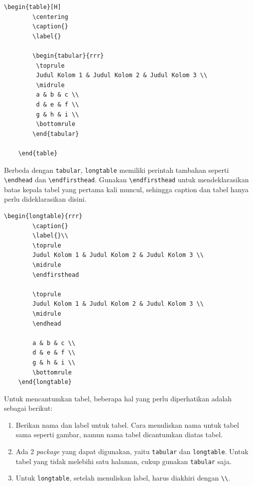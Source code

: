 \begin{lstlisting}[caption={Kode Latex untuk tabel biasa}]
    \begin{table}[H]
        \centering
        \caption{}
        \label{}
        
        \begin{tabular}{rrr}
         \toprule
         Judul Kolom 1 & Judul Kolom 2 & Judul Kolom 3 \\
         \midrule
         a & b & c \\
         d & e & f \\
         g & h & i \\
         \bottomrule
        \end{tabular}

    \end{table}
\end{lstlisting}

Berbeda dengan \texttt{tabular}, \texttt{longtable} memiliki perintah tambahan seperti \verb|\endhead| dan \verb|\endfirsthead|. Gunakan \verb|\endfirsthead| untuk mendeklarasikan batas kepala tabel yang pertama kali muncul, sehingga caption dan tabel hanya perlu dideklarasikan disini.

\begin{lstlisting}[caption={Kode Latex untuk tabel yang melebihi 1 halaman}]
    \begin{longtable}{rrr}
        \caption{}
        \label{}\\
        \toprule
        Judul Kolom 1 & Judul Kolom 2 & Judul Kolom 3 \\
        \midrule
        \endfirsthead
    
        \toprule
        Judul Kolom 1 & Judul Kolom 2 & Judul Kolom 3 \\
        \midrule
        \endhead
        
        a & b & c \\
        d & e & f \\
        g & h & i \\
        \bottomrule
    \end{longtable}
\end{lstlisting}

Untuk mencantumkan tabel, beberapa hal yang perlu diperhatikan adalah sebagai berikut:

\begin{enumerate}
    \item Berikan nama dan label untuk tabel. Cara menuliskan nama untuk tabel sama seperti gambar, namun nama tabel dicantumkan diatas tabel. 
    \item Ada 2 \textit{package} yang dapat digunakan, yaitu \texttt{tabular} dan \texttt{longtable}. Untuk tabel yang tidak melebihi satu halaman, cukup gunakan \texttt{tabular} saja.
    \item Untuk \texttt{longtable}, setelah menuliskan label, harus diakhiri dengan \verb|\\|.
\end{enumerate}

